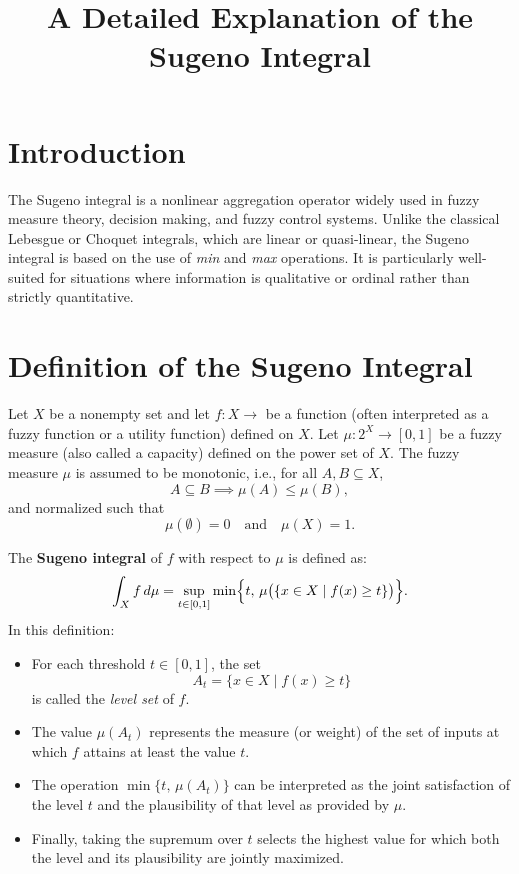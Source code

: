 \documentclass[12pt]{article}
\title{A Detailed Explanation of the Sugeno Integral}
\author{}
\date{}
\begin{document}
\maketitle

\section{Introduction}

The Sugeno integral is a nonlinear aggregation operator widely used in fuzzy measure theory, decision making, and fuzzy control systems. Unlike the classical Lebesgue or Choquet integrals, which are linear or quasi-linear, the Sugeno integral is based on the use of \emph{min} and \emph{max} operations. It is particularly well-suited for situations where information is qualitative or ordinal rather than strictly quantitative.

\section{Definition of the Sugeno Integral}

Let \(X\) be a nonempty set and let \(f: X \to \) be a function (often interpreted as a fuzzy function or a utility function) defined on \(X\). Let \(\mu: 2^X \to [0,1]\) be a fuzzy measure (also called a capacity) defined on the power set of \(X\). The fuzzy measure \(\mu\) is assumed to be monotonic, i.e., for all \(A, B \subseteq X\),
\[
A \subseteq B \implies \mu(A) \leq \mu(B),
\]
and normalized such that
\[
\mu(\emptyset) = 0 \quad \text{and} \quad \mu(X) = 1.
\]

The \textbf{Sugeno integral} of \(f\) with respect to \(\mu\) is defined as:
\[
\int_X f \,d\mu = \sup_{t \in [0,1]} \min\Bigl\{t,\, \mu\bigl(\{ x \in X \mid f(x) \geq t \}\bigr)\Bigr\}.
\]
In this definition:
\begin{itemize}
  \item For each threshold \(t \in [0,1]\), the set
  \[
  A_t = \{ x \in X \mid f(x) \geq t \}
  \]
  is called the \emph{level set} of \(f\).
  \item The value \(\mu(A_t)\) represents the measure (or weight) of the set of inputs at which \(f\) attains at least the value \(t\).
  \item The operation \(\min\{t,\, \mu(A_t)\}\) can be interpreted as the joint satisfaction of the level \(t\) and the plausibility of that level as provided by \(\mu\).
  \item Finally, taking the supremum over \(t\) selects the highest value for which both the level and its plausibility are jointly maximized.
\end{itemize}
\end{document}

